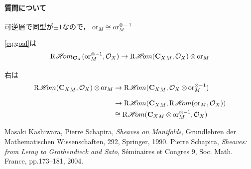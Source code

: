\documentclass[uplatex,dvipdfmx,a4paper,10pt]{jsarticle}
\theoremstyle{definition}
\newcommand{\cc}{\mathbf{C}}
\newcommand{\mcal}{\mathcal}
\numberwithin{equation}{section}
\newcommand{\cO}{\mcal{O}}
\newcommand{\HOM}{\mathop{\mathscr{H}\hspace{-2pt}om}\nolimits}%
\newcommand{\RHOM}{\mathop{\mathrm{R}\hspace{-1.5pt}\HOM}\nolimits}
\newcommand{\ori}{\mathord{\mathrm{or}}}
\newcommand{\tens}[1][]{\mathbin{\otimes_{\raise1.5ex\hbox to-.1em{}{#1}}}}
\newcommand{\ttens}[1][]{\mathbin{\mathop{\overset{\mathrm{}}{\tens}}_{#1}}}
\theoremstyle{mystyle}
\begin{document}
\paragraph{質問について}

可逆層で同型が\(\pm1\)なので，
\(\ori_M\cong\ori_{M}^{\otimes -1}\)

\eqref{eq:goal}は
\[
    \RHOM_{\cc_X}(\ori_{M}^{\otimes -1},\cO_X)%
    \to
    \RHOM({\cc_{X}}_{M},\cO_X)\ttens[]\ori_{M}
\]
右は
\begin{align*}
    \RHOM({\cc_{X}}_{M},\cO_X)\ttens[]\ori_{M}
    &\to
    \RHOM({\cc_{X}}_{M},\cO_X\ttens[]\ori_{M}^{\otimes -1})\\
    &\to
    \RHOM({\cc_{X}}_{M},\RHOM(\ori_{M},\cO_X))\\
    &\cong
    \RHOM({\cc_{X}}_{M}\tens[]\ori_{M}^{\otimes -1},\cO_X)
\end{align*}















\begin{thebibliography}{20} 
     Masaki Kashiwara, Pierre Schapira, 
      \textit{Sheaves on Manifolds}, 
      Grundlehren der Mathematischen Wissenschaften, 292, Springer, 1990.
     Pierre Schapira, 
      \textit{Sheaves: from Leray to Grothendieck and Sato}, 
      S\'eminaires et Congres 9, Soc. Math. France, pp.173--181, 2004.
\end{thebibliography}
  
\end{document}

